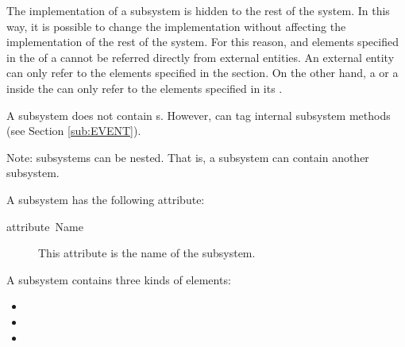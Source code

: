 The implementation of a subsystem is hidden to the rest of the system.
In this way, it is possible to change the implementation without
affecting the implementation of the rest of the system. For this
reason,  and  elements specified in
the  of a  cannot be referred
directly from external entities. An external entity can only refer to
the  elements specified in the
 section. On the other hand, a 
or a  inside the  can only refer to
the  elements specified in its
.



A subsystem does not contain s. However, 
can tag internal subsystem methods (see Section \ref{sub:EVENT}).

Note: subsystems can be nested. That is, a subsystem can contain
another subsystem.

A subsystem has the following attribute:

\begin{description}
\item [{attribute~Name}] This attribute is the name of the subsystem.
\end{description}

A subsystem contains three kinds of elements:

\begin{itemize}
\item {}
\item {}
\item {}
\end{itemize}

\subsubsection{}

